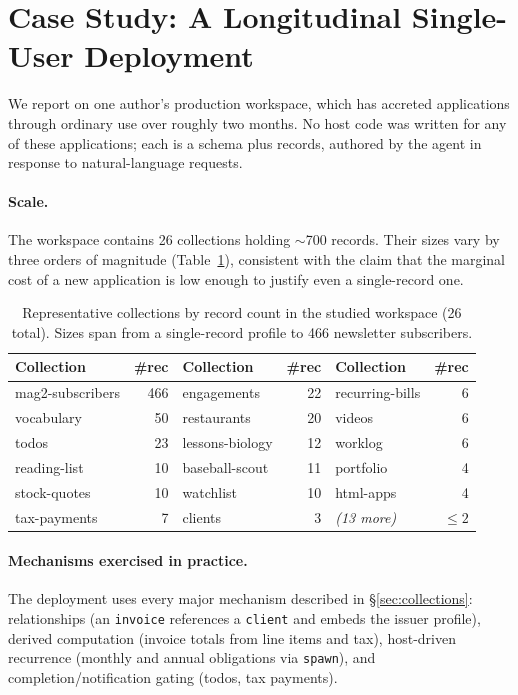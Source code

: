 \documentclass[11pt]{article}
\newcommand{\code}[1]{\texttt{\small #1}}
\begin{document}
\section{Case Study: A Longitudinal Single-User Deployment}
\label{sec:casestudy}

We report on one author's production workspace, which has accreted applications
through ordinary use over roughly two months. No host code was written for any of
these applications; each is a schema plus records, authored by the agent in
response to natural-language requests.

\paragraph{Scale.}
The workspace contains 26 collections holding $\sim$700 records. Their sizes vary
by three orders of magnitude (Table~\ref{tab:collections}), consistent with the
claim that the marginal cost of a new application is low enough to justify even a
single-record one.

\begin{table}[t]
\centering
\small
\begin{tabular}{@{}lr lr lr@{}}
\toprule
Collection & \#rec & Collection & \#rec & Collection & \#rec \\
\midrule
mag2-subscribers & 466 & engagements & 22 & recurring-bills & 6 \\
vocabulary       & 50  & restaurants & 20 & videos          & 6 \\
todos            & 23  & lessons-biology & 12 & worklog      & 6 \\
reading-list     & 10  & baseball-scout  & 11 & portfolio    & 4 \\
stock-quotes     & 10  & watchlist       & 10 & html-apps    & 4 \\
tax-payments     & 7   & clients         & 3  & \emph{(13 more)} & $\le 2$ \\
\bottomrule
\end{tabular}
\caption{Representative collections by record count in the studied workspace
(26 total). Sizes span from a single-record profile to 466 newsletter
subscribers.}
\label{tab:collections}
\end{table}

\paragraph{Mechanisms exercised in practice.}
The deployment uses every major mechanism described in \S\ref{sec:collections}:
relationships (an \code{invoice} references a \code{client} and embeds the issuer
profile), derived computation (invoice totals from line items and tax),
host-driven recurrence (monthly and annual obligations via \code{spawn}), and
completion/notification gating (todos, tax payments).
\end{document}
